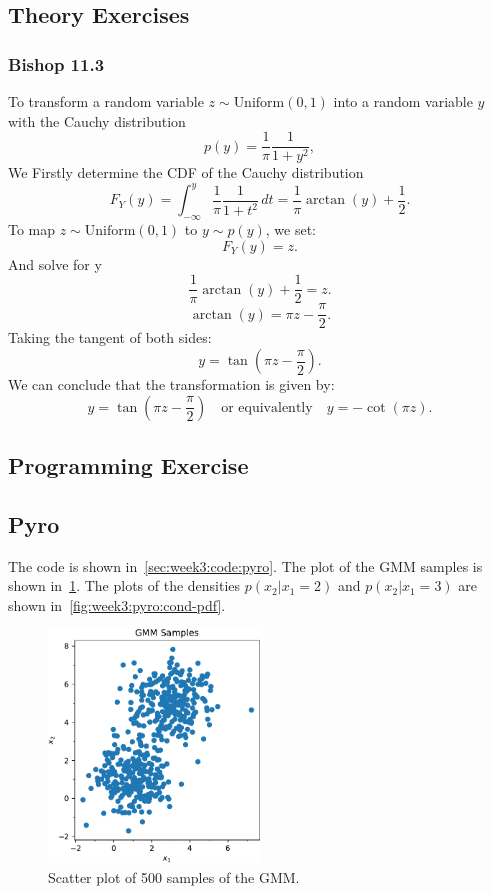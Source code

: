 \subsection{Theory Exercises}

\subsubsection*{Bishop 11.3}

To transform a random variable \( z \sim \text{Uniform}(0, 1) \) into a random variable \( y \) with the Cauchy distribution 
\[
p(y) = \frac{1}{\pi} \frac{1}{1 + y^2},
\]
We Firstly determine the CDF of the Cauchy distribution
\[
F_Y(y) = \int_{-\infty}^y \frac{1}{\pi} \frac{1}{1 + t^2} \, dt = \frac{1}{\pi} \arctan(y) + \frac{1}{2}.
\]
To map \( z \sim \text{Uniform}(0, 1) \) to \( y \sim p(y) \), we set:
\[
F_Y(y) = z.
\]
And solve for y
\[
\frac{1}{\pi} \arctan(y) + \frac{1}{2} = z.
\]
\[
\arctan(y) = \pi z - \frac{\pi}{2}.
\]
Taking the tangent of both sides:
\[
y = \tan\left(\pi z - \frac{\pi}{2}\right).
\]
We can conclude that the transformation is given by:
\[
y = \tan\left(\pi z - \frac{\pi}{2}\right) \quad \text{or equivalently} \quad y = -\cot(\pi z).
\]


\subsection{Programming Exercise}

\subsection{Pyro}

The code is shown in~\cref{sec:week3:code:pyro}.
The plot of the GMM samples is shown in~\cref{fig:week3:pyro:gmm-samples}.
The plots of the densities $p(x_2 | x_1 = 2)$ and $p(x_2 | x_1 = 3)$
are shown in~\cref{fig:week3:pyro:cond-pdf}.

\begin{figure}[htbp]
  \centering
  \includegraphics[width=0.5\textwidth]{./figures/gmm_samples.pdf}
  \caption{Scatter plot of 500 samples of the GMM.}
  \label{fig:week3:pyro:gmm-samples}
\end{figure}

